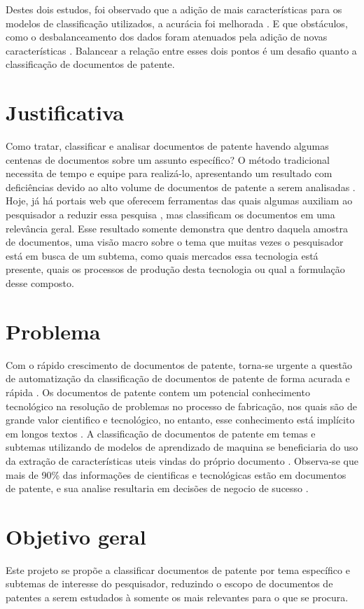 Destes dois estudos, foi observado que a adição de mais características para os modelos de classificação utilizados, a acurácia foi melhorada \cite{shahid2020}. E que obstáculos, como o desbalanceamento dos dados foram atenuados pela adição de novas características \cite{Anne2017}. Balancear a relação entre esses dois pontos é um desafio quanto a classificação de documentos de patente.

\section{Justificativa}
Como tratar, classificar e analisar documentos de patente havendo algumas centenas de documentos sobre um assunto específico? O método tradicional necessita de tempo e equipe para realizá-lo, apresentando um resultado com deficiências devido ao alto volume de documentos de patente a serem analisadas \cite{Li2018}. Hoje, já há portais web que oferecem ferramentas das quais algumas auxiliam ao pesquisador a reduzir essa pesquisa \cite{Abbas2014}, mas classificam os documentos em uma relevância geral. Esse resultado somente demonstra que dentro daquela amostra de documentos, uma visão macro sobre o tema que muitas vezes o pesquisador está em busca de um subtema, como quais mercados essa tecnologia está presente, quais os processos de produção desta tecnologia ou qual a formulação desse composto. 

\section{Problema}
Com o rápido crescimento de documentos de patente, torna-se urgente a questão de automatização da classificação de documentos de patente de forma acurada e rápida \cite{Zhu2020}. Os documentos de patente contem um potencial conhecimento tecnológico na resolução de problemas no processo de fabricação, nos quais são de grande valor cientifico e tecnológico, no entanto, esse conhecimento está implícito em longos textos \cite{Li2018, Wang2016}. A classificação de documentos de patente em temas e subtemas utilizando de modelos de aprendizado  de maquina se beneficiaria do uso da extração de características uteis vindas do próprio documento \cite{Anne2017}. Observa-se que mais de 90\% das informações de cientificas e tecnológicas estão em documentos de patente, e sua analise resultaria em decisões de negocio de sucesso \cite{Li2018}.

\section{Objetivo geral}
Este projeto se propõe a classificar documentos de patente por tema específico e subtemas de interesse do pesquisador, reduzindo o escopo de documentos de patentes a serem estudados à somente os mais relevantes para o que se procura.

